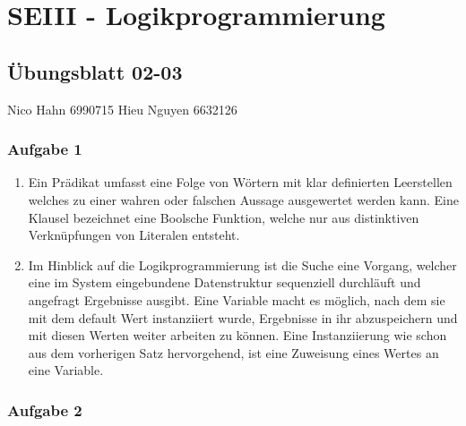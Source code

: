 \documentclass[]{article}
\date{}
\begin{document}
\section{SEIII - Logikprogrammierung}\label{header-n92}

\subsection{Übungsblatt 02-03}\label{header-n94}

Nico Hahn 6990715 Hieu Nguyen 6632126

\subsubsection{Aufgabe 1}\label{header-n98}

\begin{enumerate}
\def\labelenumi{\arabic{enumi}.}
\item
  Ein Prädikat umfasst eine Folge von Wörtern mit klar definierten
  Leerstellen welches zu einer wahren oder falschen Aussage ausgewertet
  werden kann. Eine Klausel bezeichnet eine Boolsche Funktion, welche
  nur aus distinktiven Verknüpfungen von Literalen entsteht. 
\item
  Im Hinblick auf die Logikprogrammierung ist die Suche eine Vorgang,
  welcher eine im System eingebundene Datenstruktur sequenziell
  durchläuft und angefragt Ergebnisse ausgibt. Eine Variable macht es
  möglich, nach dem sie mit dem default Wert instanziiert wurde,
  Ergebnisse in ihr abzuspeichern und mit diesen Werten weiter arbeiten
  zu können. Eine Instanziierung wie schon aus dem vorherigen Satz
  hervorgehend, ist eine Zuweisung eines Wertes an eine Variable. 
\end{enumerate}

\subsubsection{Aufgabe 2}\label{header-n106}
\end{document}
